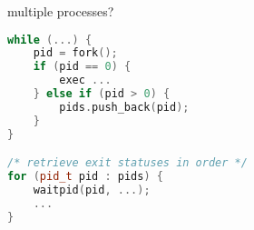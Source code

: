 
\begin{frame}[fragile,label=typicalPatternMultiple1]{multiple processes?}
\begin{lstlisting}[language=C++,style=small]
while (...) {
    pid = fork();
    if (pid == 0) {
        exec ...
    } else if (pid > 0) {
        pids.push_back(pid);
    }
}

/* retrieve exit statuses in order */
for (pid_t pid : pids) {
    waitpid(pid, ...); 
    ...
}
\end{lstlisting}
\end{frame}
